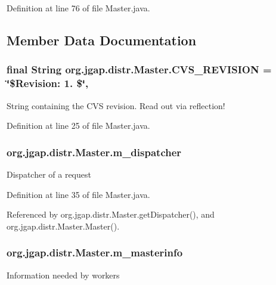 Definition at line 76 of file Master.\-java.



\subsection{Member Data Documentation}
\hypertarget{classorg_1_1jgap_1_1distr_1_1_master_ac30d904aa530e2e5f61629c3c93d82ce}{
\subsubsection[{C\-V\-S\-\_\-\-R\-E\-V\-I\-S\-I\-O\-N}]{\setlength{\rightskip}{0pt plus 5cm}final String org.\-jgap.\-distr.\-Master.\-C\-V\-S\-\_\-\-R\-E\-V\-I\-S\-I\-O\-N = \char`\"{}\$Revision\-: 1. \$\char`\"{}\hspace{0.3cm}{\ttfamily [static]}, {\ttfamily [private]}}}\label{classorg_1_1jgap_1_1distr_1_1_master_ac30d904aa530e2e5f61629c3c93d82ce}
String containing the C\-V\-S revision. Read out via reflection! 

Definition at line 25 of file Master.\-java.

\hypertarget{classorg_1_1jgap_1_1distr_1_1_master_a48a34300a87d49418097404501a7b7b7}{
\subsubsection[{m\-\_\-dispatcher}]{ org.\-jgap.\-distr.\-Master.\-m\-\_\-dispatcher\hspace{0.3cm}{\ttfamily [private]}}}\label{classorg_1_1jgap_1_1distr_1_1_master_a48a34300a87d49418097404501a7b7b7}
Dispatcher of a request 

Definition at line 35 of file Master.\-java.



Referenced by org.\-jgap.\-distr.\-Master.\-get\-Dispatcher(), and org.\-jgap.\-distr.\-Master.\-Master().

\hypertarget{classorg_1_1jgap_1_1distr_1_1_master_a999e12d2e748c75f91855f170c01103a}{
\subsubsection[{m\-\_\-masterinfo}]{ org.\-jgap.\-distr.\-Master.\-m\-\_\-masterinfo\hspace{0.3cm}{\ttfamily [private]}}}\label{classorg_1_1jgap_1_1distr_1_1_master_a999e12d2e748c75f91855f170c01103a}
Information needed by workers 

